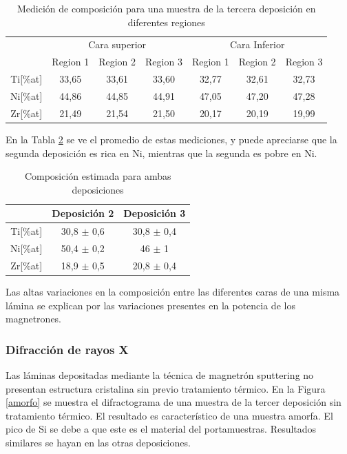 \documentclass[12pt]{article}
\theoremstyle{definition}
\theoremstyle{remark}
\begin{document}
\begin{table}[H]
\begin{tabular}{c|c|c|c|c|c|c|}
\cline{2-7}
\multicolumn{1}{l|}{} & \multicolumn{3}{c|}{Cara superior} & \multicolumn{3}{c|}{Cara Inferior} \\ \cline{2-7} 
\multicolumn{1}{l|}{} & Region 1 & Region 2 & Region 3 & Region 1 & Region 2 & Region 3 \\ \hline
\multicolumn{1}{|c|}{Ti{[}\%at{]}} & 33,65 & 33,61 & 33,60 & 32,77 & 32,61 & 32,73 \\ \hline
\multicolumn{1}{|c|}{Ni{[}\%at{]}} & 44,86 & 44,85 & 44,91 & 47,05 & 47,20 & 47,28 \\ \hline
\multicolumn{1}{|c|}{Zr{[}\%at{]}} & 21,49 & 21,54 & 21,50 & 20,17 & 20,19 & 19,99 \\ \hline
\end{tabular}
\caption{Medición de composición para una muestra de la tercera deposición en diferentes regiones}
\label{composition3}
\end{table}

En la Tabla \ref{compositionAvg} se ve el promedio de estas mediciones, y puede apreciarse que la segunda deposición es rica en Ni, mientras que la segunda es pobre en Ni.


\begin{table}[H]
\centering
\begin{tabular}{c|c|c|}
\cline{2-3}
\multicolumn{1}{l|}{} & Deposición 2 & Deposición 3 \\ \hline
\multicolumn{1}{|c|}{Ti{[}\%at{]}} & 30,8 $\pm$ 0,6 & 30,8 $\pm$ 0,4 \\ \hline
\multicolumn{1}{|c|}{Ni{[}\%at{]}} & 50,4 $\pm$ 0,2 & 46 $\pm$ 1 \\ \hline
\multicolumn{1}{|c|}{Zr{[}\%at{]}} & 18,9 $\pm$ 0,5 & 20,8 $\pm$ 0,4 \\ \hline
\end{tabular}
\caption{Composición estimada para ambas deposiciones}
\label{compositionAvg}
\end{table}

Las altas variaciones en la composición entre las diferentes caras de una misma lámina se explican por las variaciones presentes en la potencia de los magnetrones. 

\subsubsection{Difracción de rayos X}
Las láminas depositadas mediante la técnica de magnetrón sputtering no presentan estructura cristalina sin previo tratamiento térmico. En la Figura \ref{amorfo} se muestra el difractograma de una muestra de la tercer deposición sin tratamiento térmico. El resultado es característico de una muestra amorfa. El pico de Si se debe a que este es el material del portamuestras. Resultados similares se hayan en las otras deposiciones.
\end{document}
